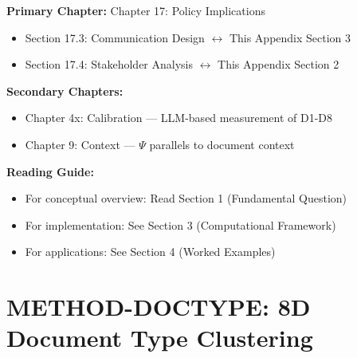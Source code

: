 \begin{tcolorbox}[colback=purple!5!white, colframe=purple!75!black,
    title=Chapter Linkage]

\textbf{Primary Chapter:} Chapter 17: Policy Implications
\begin{itemize}[nosep]
\item Section 17.3: Communication Design $\leftrightarrow$ This Appendix Section 3
\item Section 17.4: Stakeholder Analysis $\leftrightarrow$ This Appendix Section 2
\end{itemize}

\textbf{Secondary Chapters:}
\begin{itemize}[nosep]
\item Chapter 4x: Calibration --- LLM-based measurement of D1-D8
\item Chapter 9: Context --- $\Psi$ parallels to document context
\end{itemize}

\textbf{Reading Guide:}
\begin{itemize}[nosep]
\item For conceptual overview: Read Section 1 (Fundamental Question)
\item For implementation: See Section 3 (Computational Framework)
\item For applications: See Section 4 (Worked Examples)
\end{itemize}

\end{tcolorbox}

\chapter{METHOD-DOCTYPE: 8D Document Type Clustering}
\label{app:doctype}

\begin{abstract}
This appendix presents a computational framework for characterizing document types
as points in an 8-dimensional space. The eight dimensions---Knowledge, Proximity,
Scope, Time, Goal, Context, Emotion, and Persistence---enable automated clustering
of document types, identification of gaps in the document space, and systematic
style recommendations. The framework treats document types not as fixed categories
but as emergent clusters in a continuous audience-centered space.
\end{abstract}

